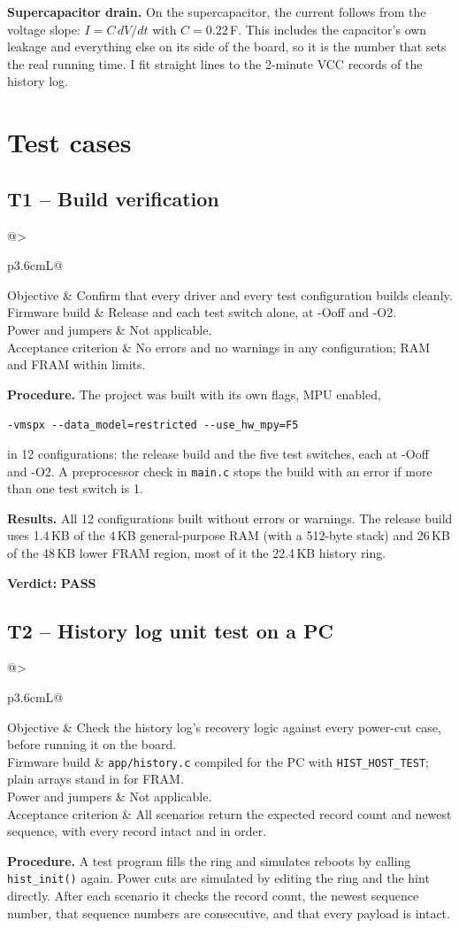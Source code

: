 \documentclass[11pt,a4paper]{article}
\makeatletter
\newcommand{\code}[1]{\texttt{#1}}
\newcommand{\pass}{\textbf{\textcolor{green!45!black}{PASS}}}
\newcommand{\testcase}[7]{%
  \subsection{#1 -- #2}\label{#3}
  \noindent\begin{tabularx}{\textwidth}{@{}>{\raggedright\arraybackslash\bfseries}p{3.6cm}L@{}}
  \toprule
  Objective & #4 \\
  Firmware build & #5 \\
  Power and jumpers & #6 \\
  Acceptance criterion & #7 \\
  \bottomrule
  \end{tabularx}\par\medskip}
\makeatother
\begin{document}
\textbf{Supercapacitor drain.} On the supercapacitor, the current follows from the voltage slope: $I = C\,dV/dt$ with $C = 0.22$\,F. This includes the capacitor's own leakage and everything else on its side of the board, so it is the number that sets the real running time. I fit straight lines to the 2-minute VCC records of the history log.

\section{Test cases}
\label{sec:tests}

\testcase{T1}{Build verification}{t:build}
  {Confirm that every driver and every test configuration builds cleanly.}
  {Release and each test switch alone, at -Ooff and -O2.}
  {Not applicable.}
  {No errors and no warnings in any configuration; RAM and FRAM within limits.}

\textbf{Procedure.} The project was built with its own flags, MPU enabled,
\begin{center}\code{-vmspx -{}-data\_model=restricted -{}-use\_hw\_mpy=F5}\end{center}
in 12 configurations: the release build and the five test switches, each at -Ooff and -O2. A preprocessor check in \code{main.c} stops the build with an error if more than one test switch is 1.

\textbf{Results.} All 12 configurations built without errors or warnings. The release build uses 1.4\,KB of the 4\,KB general-purpose RAM (with a 512-byte stack) and 26\,KB of the 48\,KB lower FRAM region, most of it the 22.4\,KB history ring.

\textbf{Verdict:} \pass

\testcase{T2}{History log unit test on a PC}{t:hist}
  {Check the history log's recovery logic against every power-cut case, before running it on the board.}
  {\code{app/history.c} compiled for the PC with \code{HIST\_HOST\_TEST}; plain arrays stand in for FRAM.}
  {Not applicable.}
  {All scenarios return the expected record count and newest sequence, with every record intact and in order.}

\textbf{Procedure.} A test program fills the ring and simulates reboots by calling \code{hist\_init()} again. Power cuts are simulated by editing the ring and the hint directly. After each scenario it checks the record count, the newest sequence number, that sequence numbers are consecutive, and that every payload is intact.
\end{document}
